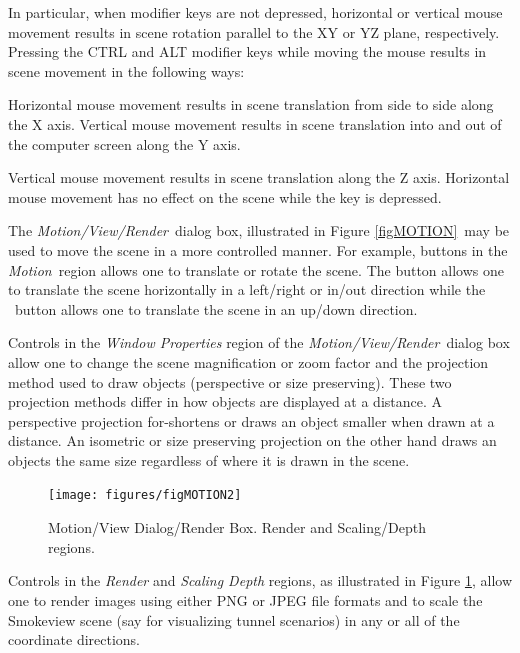 \documentclass[11pt,twoside]{book}
\newcommand{\figoptions}{hbp}
\newcommand{\parma}{.75}
\newcommand{\parmb}{.5}
\newcommand{\parmc}{0.25}
\newcommand{\frameit}[1]{\fbox{\tt #1}}
\newcommand{\blist}{
\begin{list}
{}{
\setlength{\leftmargin}{\parma in}
\setlength{\labelwidth}{\parmb in}
\setlength{\labelsep}{\parmc in}
\setlength{\listparindent}{0.3in}
\setlength{\topsep}{.3in}
\setlength{\parsep}{.0in}
}}
\newcommand{\elist}{\end{list}}
\newcommand{\hitem}[1]{\item[{\bf #1} \hfill]}
\begin{document}
In particular, when modifier keys are not depressed, horizontal or
vertical mouse movement results in scene rotation parallel to the
XY or YZ plane, respectively. Pressing the CTRL and ALT modifier
keys while moving the mouse results in scene movement in the
following ways:

\blist

\hitem{CTRL key depressed} Horizontal mouse movement results in
scene translation from side to side along the X axis. Vertical
mouse movement results in scene translation into and out of the
computer screen along the Y axis.

\hitem{ALT key depressed} Vertical mouse movement results in scene
translation along the Z axis.  Horizontal mouse movement has no
effect on the scene while the \frameit{ALT} key is depressed.

\elist

The {\em Motion/View/Render}\ dialog box, illustrated in Figure \ref{figMOTION}\, may be used to move the scene in a
more controlled manner. For example, buttons in the {\em Motion}\ region allows one to translate or rotate the scene.
The \frameit{Horizontal} button allows one to translate the scene horizontally in a left/right or in/out
direction while the \frameit{Vertical}\ button allows one to translate the scene in an up/down direction.

Controls in the {\em Window Properties} region of the {\em Motion/View/Render}\ dialog box
allow one to change the scene magnification or zoom factor and the
projection method used to draw objects (perspective or size preserving).
These two projection methods differ in how objects are displayed
at a distance.  A perspective projection for-shortens or draws an
object smaller when drawn at a distance. An isometric or size preserving projection
on the other hand draws an objects the same size regardless of
where it is drawn in the scene.

\begin{figure}[\figoptions]
\centerline{
\texttt{[image: figures/figMOTION2]}
}
\caption[Motion/View/Render Dialog Box - Render and Scaling/Depth regions.]{Motion/View Dialog/Render Box. Render and Scaling/Depth regions.}
\label{figMOTIONb}
\end{figure}

Controls in the {\em Render} and {\em Scaling Depth} regions, as illustrated in Figure \ref{figMOTIONb}, allow one to render images using either PNG or JPEG file formats and to scale the Smokeview scene (say for visualizing tunnel scenarios) in any or all of the coordinate directions.
\end{document}

